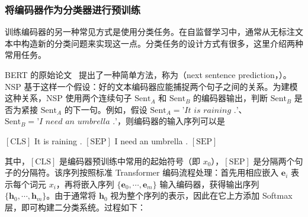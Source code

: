 \subsubsection{将编码器作为分类器进行预训练}
\label{sec:pre-training-as-classification}

\noindent 训练编码器的另一种常见方式是使用分类任务。在自监督学习中，通常从无标注文本中构造新的分类问题来实现这一点。分类任务的设计方式有很多，这里介绍两种常用任务。

BERT 的原始论文~\cite{devlin-etal:2019bert} 提出了一种简单方法，称为（next sentence prediction，）。NSP 基于这样一个假设：好的文本编码器应能捕捉两个句子之间的关系。为建模这种关系，NSP 使用两个连续句子 $\mathrm{Sent}_{A}$ 和 $\mathrm{Sent}_{B}$ 的编码器输出，判断 $\mathrm{Sent}_{B}$ 是否为紧接 $\mathrm{Sent}_{A}$ 的下一句。例如，假设 $\mathrm{Sent}_{A} = \textit{'It is raining .'}$、$\mathrm{Sent}_{B} = \textit{'I need an umbrella .'}$，则编码器的输入序列可以是

\vspace{0.5em}
\begin{center}
$[\mathrm{CLS}]$ It is raining . $[\mathrm{SEP}]$ I need an umbrella . $[\mathrm{SEP}]$
\end{center}
\vspace{0.5em}

\noindent 其中，$[\mathrm{CLS}]$ 是编码器预训练中常用的起始符号（即 $x_0$），$[\mathrm{SEP}]$ 是分隔两个句子的分隔符。该序列按照标准 Transformer 编码流程处理：首先用相应嵌入 $\mathbf{e}_i$ 表示每个词元 $x_i$，再将嵌入序列 $\{\mathbf{e}_{0},\cdots,\mathbf{e}_m\}$ 输入编码器，获得输出序列 $\{\mathbf{h}_{0},\cdots,\mathbf{h}_m\}$。由于通常将 $\mathbf{h}_{0}$ 视为整个序列的表示，因此在它上方添加 Softmax 层，即可构建二分类系统。过程如下：

